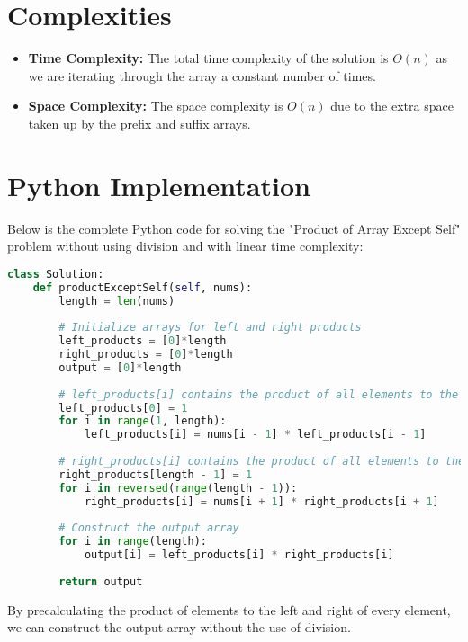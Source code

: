 \section*{Complexities}
\begin{itemize}
	\item \textbf{Time Complexity:} The total time complexity of the solution is \(O(n)\) as we are iterating through the array a constant number of times.
	\item \textbf{Space Complexity:} The space complexity is \(O(n)\) due to the extra space taken up by the prefix and suffix arrays.
\end{itemize}

\section*{Python Implementation}
Below is the complete Python code for solving the "Product of Array Except Self" problem without using division and with linear time complexity:

\begin{fullwidth}
\begin{lstlisting}[language=Python]
class Solution:
    def productExceptSelf(self, nums):
        length = len(nums)
        
        # Initialize arrays for left and right products
        left_products = [0]*length
        right_products = [0]*length
        output = [0]*length
        
        # left_products[i] contains the product of all elements to the left of i
        left_products[0] = 1
        for i in range(1, length):
            left_products[i] = nums[i - 1] * left_products[i - 1]
        
        # right_products[i] contains the product of all elements to the right of i
        right_products[length - 1] = 1
        for i in reversed(range(length - 1)):
            right_products[i] = nums[i + 1] * right_products[i + 1]
        
        # Construct the output array
        for i in range(length):
            output[i] = left_products[i] * right_products[i]
        
        return output
\end{lstlisting}
\end{fullwidth}

By precalculating the product of elements to the left and right of every element, we can construct the output array without the use of division.

